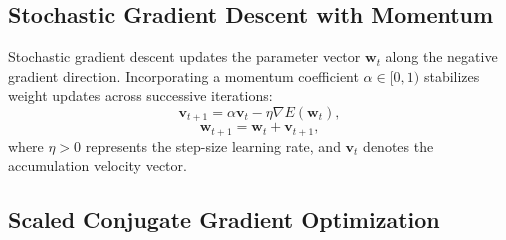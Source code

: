 \documentclass[10pt, conference]{IEEEtran}
\begin{document}
\subsection{Stochastic Gradient Descent with Momentum}

Stochastic gradient descent updates the parameter vector $\mathbf{w}_t$ along the negative gradient direction. Incorporating a momentum coefficient $\alpha \in [0, 1)$ stabilizes weight updates across successive iterations:
\begin{equation}
\mathbf{v}_{t+1} = \alpha \mathbf{v}_t - \eta \nabla E(\mathbf{w}_t),
\end{equation}
\begin{equation}
\mathbf{w}_{t+1} = \mathbf{w}_t + \mathbf{v}_{t+1},
\end{equation}
where $\eta > 0$ represents the step-size learning rate, and $\mathbf{v}_t$ denotes the accumulation velocity vector.

\subsection{Scaled Conjugate Gradient Optimization}
\end{document}
